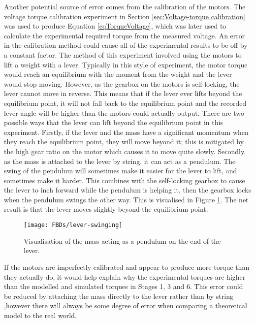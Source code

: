 Another potential source of error comes from the calibration of the motors. The voltage torque calibration experiment in Section \ref{sec:Voltage-torque calibration} was used to produce Equation \ref{eqTorqueVoltage}, which was later used to calculate the experimental required torque from the measured voltage. An error in the calibration method could cause all of the experimental results to be off by a constant factor. The method of this experiment involved using the motors to lift a weight with a lever. Typically in this style of experiment, the motor torque would reach an equilibrium with the moment from the weight and the lever would stop moving. However, as the gearbox on the motors is self-locking, the lever cannot move in reverse. This means that if the lever ever lifts beyond the equilibrium point, it will not fall back to the equilibrium point and the recorded lever angle will be higher than the motors could actually output. There are two possible ways that the lever can lift beyond the equilibrium point in this experiment. Firstly, if the lever and the mass have a significant momentum when they reach the equilibrium point, they will move beyond it; this is mitigated by the high gear ratio on the motor which causes it to move quite slowly. Secondly, as the mass is attached to the lever by string, it can act as a pendulum. The swing of the pendulum will sometimes make it easier for the lever to lift, and sometimes make it harder. This combines with the self-locking gearbox to cause the lever to inch forward while the pendulum is helping it, then the gearbox locks when the pendulum swings the other way. This is visualised in Figure \ref{fig:lever-swinging}. The net result is that the lever moves slightly beyond the equilibrium point. \\

\begin{figure}[!h]
	\centering
	\texttt{[image: FBDs/lever-swinging]}
	\caption{Visualisation of the mass acting as a pendulum on the end of the lever.}
	\label{fig:lever-swinging}
\end{figure}

If the motors are imperfectly calibrated and appear to produce more torque than they actually do, it would help explain why the experimental torques are higher than the modelled and simulated torques in Stages 1, 3 and 6. This error could be reduced by attaching the mass directly to the lever rather than by string ,however there will always be some degree of error when comparing a theoretical model to the real world.

